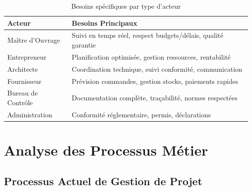 \documentclass[12pt, a4paper]{report}
\begin{document}
\begin{table}[h]
\centering
\caption{Besoins spécifiques par type d'acteur}
\begin{tabular}{|p{3cm}|p{9cm}|}
\hline
\textbf{Acteur} & \textbf{Besoins Principaux} \\
\hline
Maître d'Ouvrage & Suivi en temps réel, respect budgets/délais, qualité garantie \\
\hline
Entrepreneur & Planification optimisée, gestion ressources, rentabilité \\
\hline
Architecte & Coordination technique, suivi conformité, communication \\
\hline
Fournisseur & Prévision commandes, gestion stocks, paiements rapides \\
\hline
Bureau de Contrôle & Documentation complète, traçabilité, normes respectées \\
\hline
Administration & Conformité réglementaire, permis, déclarations \\
\hline
\end{tabular}
\end{table}

\section{Analyse des Processus Métier}

\subsection{Processus Actuel de Gestion de Projet}
\end{document}
